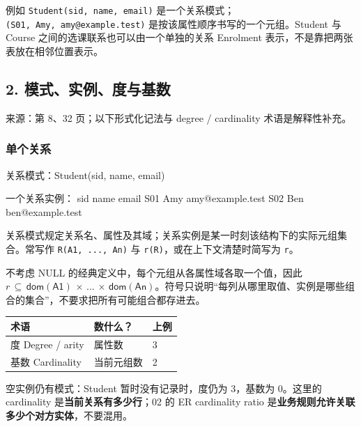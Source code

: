 例如 \texttt{Student(\allowbreak{}sid,\allowbreak{}\ name,\allowbreak{}\ email)\allowbreak{}} 是一个关系模式；\texttt{(\allowbreak{}S01,\allowbreak{}\ Amy,\allowbreak{}\ amy@example.\allowbreak{}test)\allowbreak{}} 是按该属性顺序书写的一个元组。Student 与 Course 之间的选课联系也可以由一个单独的关系 Enrolment 表示，不是靠把两张表放在相邻位置表示。

\subsection{2. 模式、实例、度与基数}\label{03_relational_model_and_integrity_zh-ux6a21ux5f0fux5b9eux4f8bux5ea6ux4e0eux57faux6570}

来源：第 8、32 页；以下形式化记法与 degree / cardinality 术语是解释性补充。

\subsubsection{单个关系}\label{03_relational_model_and_integrity_zh-ux5355ux4e2aux5173ux7cfb}

\begin{StudyCode}
关系模式：Student(sid, name, email)

一个关系实例：
sid   name   email
S01   Amy    amy@example.test
S02   Ben    ben@example.test
\end{StudyCode}

关系模式规定关系名、属性及其域；关系实例是某一时刻该结构下的实际元组集合。常写作 \texttt{R(\allowbreak{}A1,\allowbreak{}\ .\allowbreak{}.\allowbreak{}.\allowbreak{},\allowbreak{}\ An)\allowbreak{}} 与 \texttt{r(\allowbreak{}R)\allowbreak{}}，或在上下文清楚时简写为 \texttt{r}。

不考虑 NULL 的经典定义中，每个元组从各属性域各取一个值，因此 \(r\,\subseteq \,\mathsf{dom}(\mathsf{A1})\,\times \,...\,\times \,\mathsf{dom}(\mathsf{An})\)。符号只说明``每列从哪里取值、实例是哪些组合的集合''，不要求把所有可能组合都存进去。

\begin{longtable}[]{@{}lll@{}}
\toprule\noalign{}
术语 & 数什么？ & 上例 \\
\midrule\noalign{}
\endhead
\bottomrule\noalign{}
\endlastfoot
度 Degree / arity & 属性数 & 3 \\
基数 Cardinality & 当前元组数 & 2 \\
\end{longtable}

空实例仍有模式：Student 暂时没有记录时，度仍为 3，基数为 0。这里的 cardinality 是\textbf{当前关系有多少行}；02 的 ER cardinality ratio 是\textbf{业务规则允许关联多少个对方实体}，不要混用。

